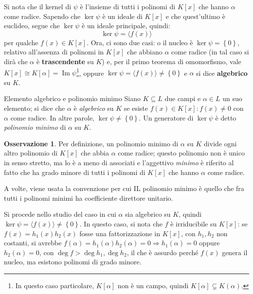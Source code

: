 \documentclass[11pt, a4paper]{scrartcl}
\theoremstyle{definition}
\numberwithin{esempio}{section}
\theoremstyle{definition}
\newtheorem{obs}{Osservazione}
\numberwithin{obs}{section}
\numberwithin{nota}{section}
\numberwithin{equation}{subsection}
\begin{document}
Si nota che il kernel di $\psi $ \`e l'insieme di tutti i polinomi di $K[x]$ che hanno $\alpha $ come radice. 
Sapendo che $\operatorname{ker} \psi $ \`e un ideale di $K[x]$ e che quest'ultimo \`e euclideo, segue che $\operatorname{ker} \psi $ \`e un ideale principale, quindi:
\[
\operatorname{ker} \psi  = \langle f(x) \rangle
\] 
per qualche $f(x) \in K[x]$.
Ora, ci sono due casi: o il nucleo \`e $\operatorname{ker} \psi  = \left\{ 0 \right\} $, relativo all'assenza di polinomi in $K[x]$ che abbiano $\alpha$ come radice (in tal caso si dir\`a che $\alpha $ \`e \textbf{trascendente} su $K$) e, per il primo teorema di omomorfismo, vale $K[x] \cong K[\alpha ] = \operatorname{Im} \psi $\footnote{In questo caso particolare, $K[\alpha ]$ non \`e un campo, quindi $K[\alpha ]\subsetneq K(\alpha )$.}, oppure $\operatorname{ker} \psi = \langle f(x) \rangle \neq \left\{ 0 \right\} $ e $\alpha $ si dice \textbf{algebrico} su $K$.
\begin{definizione}
	{Elemento algebrico e polinomio minimo}{}
	Siano $K \subseteq L$ due campi e $\alpha \in L $ un suo elemento; si dice che $\alpha $ \`e \textit{algebrico} su $K$ se esiste $f(x) \in K[x] : f(x) \neq 0$ con $\alpha $ come radice.
	In altre parole, $\operatorname{ker} \psi \neq \left\{ 0 \right\} $.
	Un generatore di $ \operatorname{ker} \psi $ \`e detto \textit{polinomio minimo} di $\alpha $ su $K$.
\end{definizione}
\begin{obs}
	Per definizione, un polinomio minimo di $\alpha $ su $K$ divide ogni altro polinomio di $K[x]$ che abbia $\alpha $ come radice; questo polinomio non \`e unico in senso stretto, ma lo \`e a meno di associati e l'aggettivo \textit{minimo} \`e riferito al fatto che ha grado minore di tutti i polinomi di $K[x]$ che hanno $\alpha $ come radice. 

	A volte, viene usata la convenzione per cui IL polinomio minimo \`e quello che fra tutti i polinomi minimi ha coefficiente direttore unitario.
\end{obs}
\noindent Si procede nello studio del caso in cui $\alpha $ sia algebrico su $K$, quindi $\operatorname{ker} \psi = \langle f(x) \rangle\neq \left\{ 0 \right\} $.
In questo caso, si nota che $f$ \`e irriducibile su $K[x]$: se $f(x)=h_1(x)h_2(x)$ fosse una fattorizzazione in $K[x]$, con $h_1,h_2$ non costanti, si avrebbe $f(\alpha ) = h_1(\alpha ) h_2(\alpha ) = 0\Rightarrow h_1(\alpha ) = 0$ oppure $h_2(\alpha ) = 0 $, con $\operatorname{deg}  f >\operatorname{deg} h_1, \operatorname{deg} h_2 $, il che \`e assurdo perch\'e $f(x)$ genera il nucleo, ma esistono polinomi di grado minore.
\end{document}
